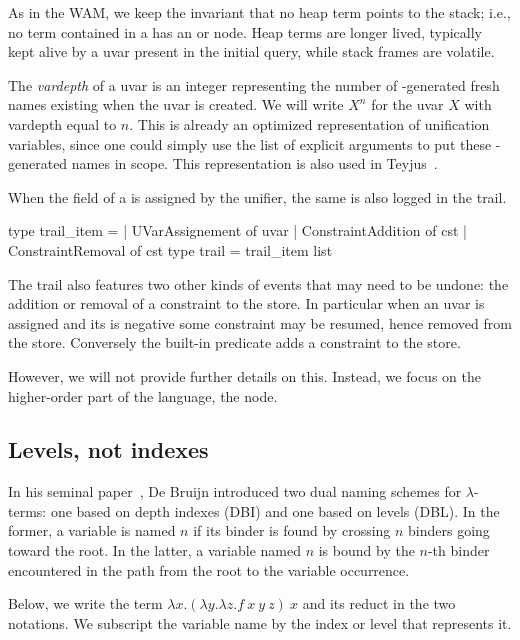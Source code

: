 \documentclass[a4paper, 11pt]{book}
\begin{document}
As in the WAM, we keep the invariant that no heap term points to the stack;
i.e., no term contained in a  has an  or
 node. Heap terms are longer lived, typically kept alive by a
uvar present in the initial query, while stack frames are volatile.


The \emph{vardepth} of a uvar is an integer representing the number of
-generated fresh names existing when the uvar is created. We will
write $X^n$ for the uvar $X$ with vardepth equal to $n$. This is already an
optimized representation of unification variables, since one could simply use
the list of explicit arguments to put these -generated names in
scope. This representation is also used in
Teyjus~\cite{DBLP:journals/corr/abs-0911-5203}.


When the  field of a  is assigned by the unifier,
the same  is also logged in the trail.

\begin{ocamlcode}
type trail_item =
| UVarAssignement of uvar
| ConstraintAddition of cst
| ConstraintRemoval  of cst
type trail = trail_item list
\end{ocamlcode}

\noindent
The trail also features two other kinds of events that may need to be undone:
the addition or removal of a constraint to the store. In particular when
an uvar is assigned and its  is negative some constraint may
be resumed, hence removed from the store. Conversely the
 built-in predicate adds a constraint to the store.

However, we will not
provide further details on this. Instead, we focus on the higher-order part of
the language, the  node.

\subsection{Levels, not indexes}\label{sec:dbl}


In his seminal paper~\cite{DEBRUIJN1994375}, De Bruijn introduced two dual
naming schemes for $\lambda$-terms: one based on depth indexes (DBI) and one
based on levels (DBL). In the former, a variable is named $n$ if its binder is
found by crossing $n$ binders going toward the root. In the latter, a variable
named $n$ is bound by the $n$-th binder encountered in the path from the root
to the variable occurrence.


Below, we write the term $\lambda x.(\lambda y.\lambda z.f\ x\ y\ z)\ x$ and its
reduct in the two notations. We subscript the variable name by the index or
level that represents it.\\
\end{document}
